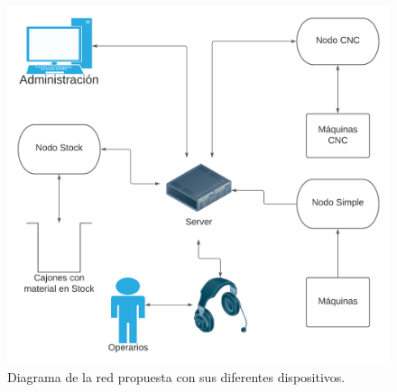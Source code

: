 \documentclass[11pt]{charter}
\begin{document}
\begin{figure}[H]
    \centering
    \includegraphics[scale=0.5]{Figuras/diagBloquesRed.png}
    \caption{Diagrama de la red propuesta con sus diferentes dispositivos.}
    \label{fig:DiagramaRed}
\end{figure}
\end{document}
